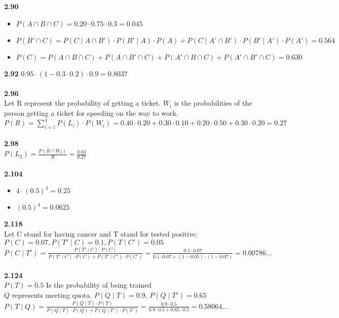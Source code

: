 \documentclass{article}
\begin{document}
    \textbf{2.90}
        \begin{itemize}
            \item $P(A\cap B \cap C) = 0.20 \cdot 0.75 \cdot 0.3 = 0.045$
            \item $P(B'\cap C) = P(C\mid A\cap B')\cdot P(B'\mid A)\cdot P(A) + P(C\mid A'\cap B')\cdot P(B'\mid A')\cdot P(A') = 0.564$
            \item $P(C) = P(A\cap B\cap C) + P(A\cap B'\cap C) + P(A'\cap B\cap C) + P(A'\cap B'\cap C) = 0.630$
        \end{itemize}
    \textbf{2.92}
        $0.95 \cdot (1 - 0.3 \cdot 0.2) \cdot 0.9 = 0.8037$\\\\
    \textbf{2.96}\\
        Let R represent the probability of getting a ticket. $W_i$ is the probabilities of the person getting a ticket for speeding on the way to work.\\
        $P(R) = \sum_{i=1}^{4}P(L_i) \cdot P(W_i) = 0.40\cdot 0.20 + 0.30 \cdot 0.10 + 0.20 \cdot 0.50 + 0.30 \cdot 0.20 = 0.27$\\\\
    \textbf{2.98}\\
        $P(L_2) = \frac{P(R\cap W_2)}{R} = \frac{0.03}{0.27}$\\\\
    \textbf{2.104}
        \begin{itemize}
            \item $4\cdot (0.5)^4 = 0.25$
            \item $(0.5)^4 = 0.0625$
        \end{itemize}
    \textbf{2.118}\\
        Let C stand for having cancer and T stand for tested positive.\\
        $P(C) = 0.07, P(T'\mid C) = 0.1, P(T\mid C') = 0.05$\\
        $P(C\mid T') = \frac{P(T'\mid C)\cdot P(C)}{P(T'\mid C)\cdot P(C) + P(T'\mid C')\cdot P(C')} = \frac{0.1 \cdot 0.07}{0.1 \cdot 0.07 + (1-0.05)\cdot(1-0.07)} = 0.00786...$\\\\
    \textbf{2.124}\\
        $P(T) = 0.5$ Is the probability of being trained\\
        $Q$ represents meeting quota. $P(Q\mid T)=0.9$, $P(Q\mid T')=0.65$\\
        $P(T\mid Q)= \frac{P(Q\mid T)\cdot P(T)}{P(Q\mid T)\cdot P(Q)+ P(Q\mid T')\cdot P(T')} = \frac{0.9\cdot 0.5}{0.9\cdot 0.5 + 0.65\cdot 0.5} = 0.58064...$
\end{document}
